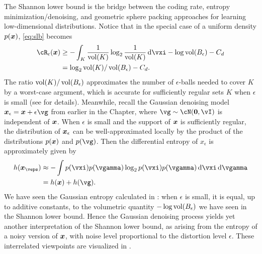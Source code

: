 \documentclass[../../book-main.tex]{subfiles}
\begin{document}
\begin{remark}
	The Shannon lower bound is the bridge between the coding rate, entropy
	minimization/denoising, and geometric sphere packing approaches for learning
	low-dimensional distributions. Notice that in the special case of a uniform
	density $p(\bm{x})$, \eqref{eq:slb} becomes
	\begin{align}
		\cR_{\epsilon}(\x) &\geq -\int_K \frac{1}{\volume(K)} \log_2
		\frac{1}{\volume(K)} \odif \vxi
		- \log \volume(B_{\epsilon}) - C_d
		\\
		&=
		\log_2 \volume(K) / \volume(B_{\epsilon})
		- C_d. \label{eq:shannon-lower-bound-uniform}
	\end{align}
	The ratio $\operatorname{vol}(K) / \operatorname{vol}(B_{\epsilon})$ approximates the number of
	$\epsilon$-balls needed to cover $K$ by a worst-case argument, which is
	accurate for sufficiently regular sets $K$ when $\epsilon$ is small (see
	 for details).
	Meanwhile, recall the Gaussian denoising model $\x_{\epsilon} = \x
	+ \epsilon \vg$ from
	earlier in the Chapter, where $\vg \sim \cN(\Zero, \vI)$ is independent of
	$\bm{x}$.
	When $\epsilon$ is small and the support of $\bm{x}$ is sufficiently regular,
	the distribution of $\bm{x}_{\epsilon}$ can be well-approximated locally by the
	product of the distributions $p(\bm{x})$ and $p(\vg)$. Then the differential
	entropy of $x_{\epsilon}$ is approximately given by
	\begin{align}
		h(\x_{\veps})
		&\approx
		-\int
		p(\vxi) p(\vgamma) \log_2 p(\vxi) p(\vgamma) \odif \vxi \odif \vgamma
		\\
		&=
		h(\x) + h(\vg).
	\end{align}
	We have seen the Gaussian entropy calculated in
	: when $\epsilon$ is small, it is equal, up
	to additive constants, to the volumetric quantity $-\log
	\operatorname{vol}(B_{\epsilon})$ we have seen in the Shannon lower bound.
	Hence the Gaussian denoising process yields yet another interpretation of
	the Shannon lower bound, as arising from the entropy of a noisy version of
	$\bm{x}$, with noise level proportional to the distortion level $\epsilon$.
	These interrelated viewpoints are visualized in .
\end{remark}
\end{document}
